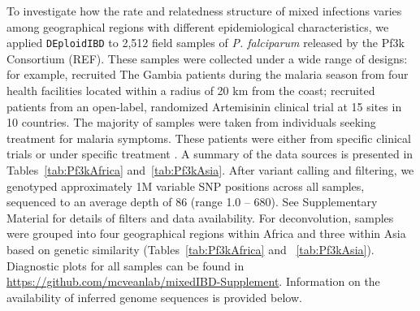 \documentclass[9pt,lineno]{elife}
\begin{document}
To investigate how the rate and relatedness structure of mixed infections varies among geographical regions with different epidemiological characteristics, we applied \texttt{DEploidIBD} to 2,512 field samples of {\it P. falciparum} released by the Pf3k Consortium (REF).  These samples were collected under a wide range of designs: for example, \citet{Amambua-Ngwa2012} recruited The Gambia patients during the malaria season from four health facilities located within a radius of 20 km from the coast; \citet{Ashley2014} recruited patients from an open-label, randomized Artemisinin clinical trial at 15 sites in 10 countries. The majority of samples were taken from individuals seeking treatment for malaria symptoms. These patients were either from specific clinical trials \citep{Ocholla2014} or under specific treatment \citep{Duffy2015, Miotto2013,eLife2016}.  A summary of the data sources is presented in Tables~\ref{tab:Pf3kAfrica} and~\ref{tab:Pf3kAsia}.  After variant calling and filtering, we genotyped approximately 1M variable SNP positions across all samples, sequenced to an average depth of 86 (range 1.0 – 680).  See Supplementary Material for details of filters and data availability.  For deconvolution, samples were grouped into four geographical regions within Africa and three within Asia based on genetic similarity (Tables~\ref{tab:Pf3kAfrica} and ~\ref{tab:Pf3kAsia}).  Diagnostic plots for all samples can be found in \url{https://github.com/mcveanlab/mixedIBD-Supplement}.  Information on the availability of inferred genome sequences is provided below.
\end{document}
